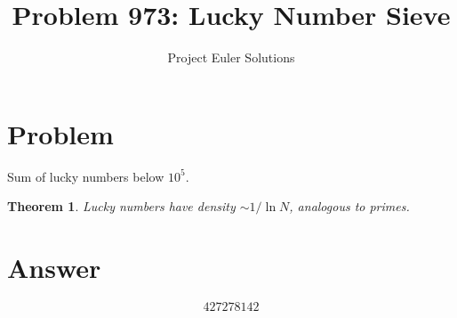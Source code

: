 \documentclass[11pt]{article}
\title{Problem 973: Lucky Number Sieve}
\author{Project Euler Solutions}
\date{}
\newtheorem{theorem}{Theorem}
\begin{document}
\maketitle
\section{Problem}
Sum of lucky numbers below $10^5$.
\begin{theorem}
Lucky numbers have density $\sim 1/\ln N$, analogous to primes.
\end{theorem}
\section{Answer}

\[
\boxed{427278142}
\]
\end{document}
